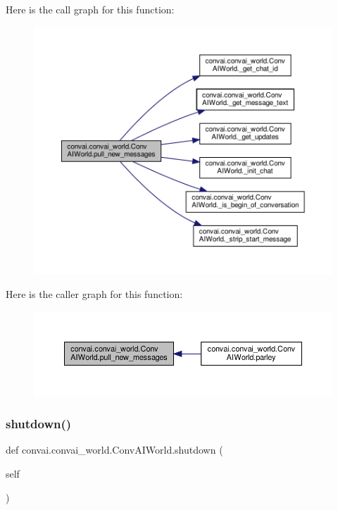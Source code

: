 Here is the call graph for this function\+:
\nopagebreak
\begin{figure}[H]
\begin{center}
\leavevmode
\includegraphics[width=350pt]{classconvai_1_1convai__world_1_1ConvAIWorld_a06a6127d5bfcc3bd03b4913b1667e659_cgraph}
\end{center}
\end{figure}
Here is the caller graph for this function\+:
\nopagebreak
\begin{figure}[H]
\begin{center}
\leavevmode
\includegraphics[width=350pt]{classconvai_1_1convai__world_1_1ConvAIWorld_a06a6127d5bfcc3bd03b4913b1667e659_icgraph}
\end{center}
\end{figure}
\mbox{\label{classconvai_1_1convai__world_1_1ConvAIWorld_a23af0c25e74dc7901662aebef74bf10c}} 
\subsubsection{\texorpdfstring{shutdown()}{shutdown()}}
{\footnotesize\ttfamily def convai.\+convai\+\_\+world.\+Conv\+A\+I\+World.\+shutdown (\begin{DoxyParamCaption}\item[{}]{self }\end{DoxyParamCaption})}



